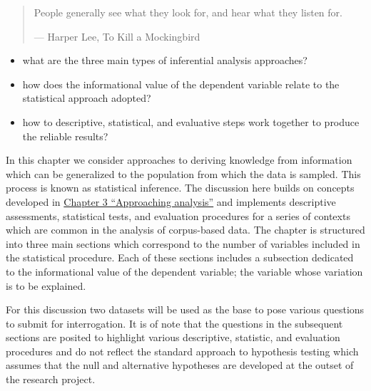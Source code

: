 \documentclass[
  letterpaper,
]{scrbook}
\providecommand{\tightlist}{%
  \setlength{\itemsep}{0pt}\setlength{\parskip}{0pt}}\usepackage{longtable,booktabs,array}
\begin{document}
\begin{quote}
People generally see what they look for, and hear what they listen for.

--- Harper Lee, To Kill a Mockingbird
\end{quote}

\begin{tcolorbox}[enhanced jigsaw, title=\textcolor{quarto-callout-note-color}{\faInfo}\hspace{0.5em}{Keys}, breakable, colback=white, colframe=quarto-callout-note-color-frame, bottomrule=.15mm, left=2mm, bottomtitle=1mm, colbacktitle=quarto-callout-note-color!10!white, opacityback=0, arc=.35mm, toprule=.15mm, coltitle=black, leftrule=.75mm, opacitybacktitle=0.6, toptitle=1mm, titlerule=0mm, rightrule=.15mm]

\begin{itemize}
\tightlist
\item
  what are the three main types of inferential analysis approaches?
\item
  how does the informational value of the dependent variable relate to
  the statistical approach adopted?
\item
  how to descriptive, statistical, and evaluative steps work together to
  produce the reliable results?
\end{itemize}

\end{tcolorbox}

In this chapter we consider approaches to deriving knowledge from
information which can be generalized to the population from which the
data is sampled. This process is known as statistical inference. The
discussion here builds on concepts developed in
\protect\hyperlink{sec-approaching-analysis}{Chapter 3 ``Approaching
analysis''} and implements descriptive assessments, statistical tests,
and evaluation procedures for a series of contexts which are common in
the analysis of corpus-based data. The chapter is structured into three
main sections which correspond to the number of variables included in
the statistical procedure. Each of these sections includes a subsection
dedicated to the informational value of the dependent variable; the
variable whose variation is to be explained.

For this discussion two datasets will be used as the base to pose
various questions to submit for interrogation. It is of note that the
questions in the subsequent sections are posited to highlight various
descriptive, statistic, and evaluation procedures and do not reflect the
standard approach to hypothesis testing which assumes that the null and
alternative hypotheses are developed at the outset of the research
project.
\end{document}
